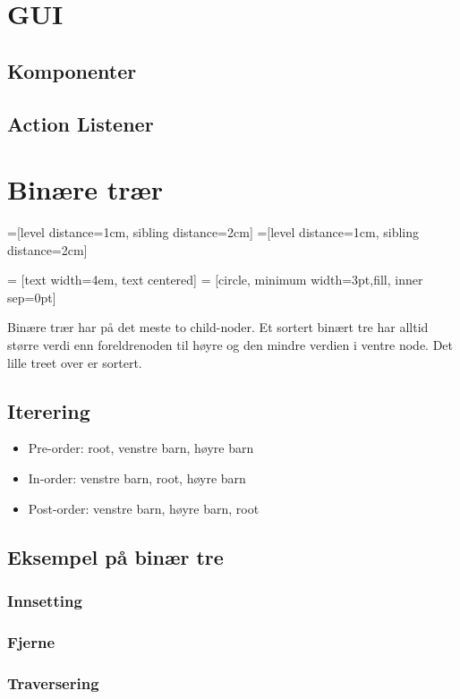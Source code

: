 \documentclass[10pt,a4paper]{article}
\begin{document}
\section{GUI}

\subsection{Komponenter}

\subsection{Action Listener}


\section{Binære trær}
=[level distance=1cm, sibling distance=2cm]
=[level distance=1cm, sibling distance=2cm]

 = [text width=4em, text centered]
 = [circle, minimum width=3pt,fill, inner sep=0pt]
\begin{center}
\end{center}

Binære trær har på det meste to child-noder. Et sortert binært tre har alltid større verdi enn foreldrenoden til høyre og den mindre verdien i ventre node. Det lille treet over er sortert.

\subsection{Iterering}
\begin{itemize}
\item{Pre-order: root, venstre barn, høyre barn}
\item{In-order: venstre barn, root, høyre barn}
\item{Post-order: venstre barn, høyre barn, root}
\end{itemize}

\subsection{Eksempel på binær tre}
\subsubsection{Innsetting}


\subsubsection{Fjerne}


\subsubsection{Traversering}

\end{document}
